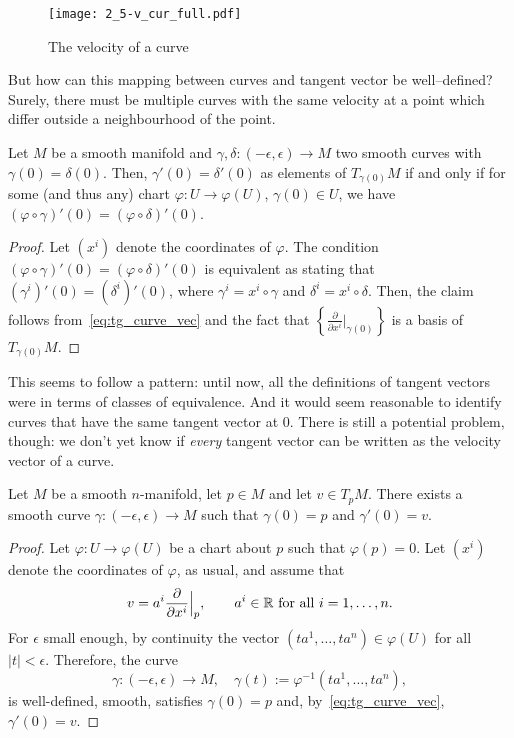 \begin{figure}[htp]
	\centering
	\texttt{[image: 2\_5-v\_cur\_full.pdf]}
	\caption{The velocity of a curve}
	\label{fig:2_5-v_cur_full}
\end{figure}

But how can this mapping between curves and tangent vector be well--defined?
Surely, there must be multiple curves with the same velocity at a point which differ outside a neighbourhood of the point.

\begin{lemma}\label{lem:equiv_tg_curves}
	Let $M$ be a smooth manifold and $\gamma, \delta : (-\epsilon, \epsilon) \to M$ two smooth curves with $\gamma(0) = \delta(0)$. Then, $\gamma'(0) = \delta'(0)$ as elements of $T_{\gamma(0)}M$ if and only if for some (and thus any) chart $\varphi:U\to\varphi(U)$, $\gamma(0)\in U$, we have $(\varphi\circ \gamma)'(0) = (\varphi\circ\delta)'(0)$.
\end{lemma}
\begin{proof}
	Let $(x^i)$ denote the coordinates of $\varphi$. The condition $(\varphi\circ \gamma)'(0) = (\varphi\circ\delta)'(0)$ is equivalent as stating that $(\gamma^i)'(0) = (\delta^i)'(0)$, where $\gamma^i = x^i\circ\gamma$ and $\delta^i=x^i\circ\delta$. Then, the claim follows from~\eqref{eq:tg_curve_vec} and the fact that $\left\{\frac{\partial}{\partial x^i}\big|_{\gamma(0)}\right\}$ is a basis of $T_{\gamma(0)}M$.
\end{proof}

This seems to follow a pattern: until now, all the definitions of tangent vectors were in terms of classes of equivalence.
And it would seem reasonable to identify curves that have the same tangent vector at $0$.
There is still a potential problem, though: we don't yet know if \emph{every} tangent vector can be written as the velocity vector of a curve.

\begin{theorem}
	Let $M$ be a smooth $n$-manifold, let $p\in M$ and let $v\in T_pM$.
	There exists a smooth curve $\gamma: (-\epsilon,\epsilon) \to M$ such that $\gamma(0)=p$ and $\gamma'(0) = v$.
\end{theorem}
\begin{proof}
	Let $\varphi:U\to\varphi(U)$ be a chart about $p$ such that $\varphi(p)=0$.
	Let $(x^i)$ denote the coordinates of $\varphi$, as usual, and assume that
	\begin{equation}
		v = a^i \frac{\partial}{\partial x^i}\Big|_p, \qquad a^i \in\mathbb{R} \mbox{ for all } i=1,\ldots,n.
	\end{equation}
	For $\epsilon$ small enough, by continuity the vector $(ta^1, \ldots, ta^n) \in \varphi(U)$ for all $|t|<\epsilon$. Therefore, the curve
	\begin{equation}
		\gamma: (-\epsilon, \epsilon) \to M, \quad \gamma(t):=\varphi^{-1}(ta^1, \ldots, ta^n),
	\end{equation}
	is well-defined, smooth, satisfies $\gamma(0) = p$ and, by~\eqref{eq:tg_curve_vec}, $\gamma'(0) = v$.
\end{proof}

